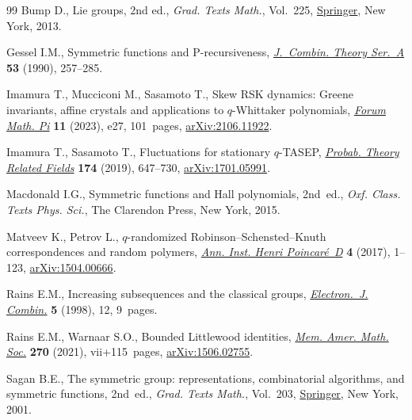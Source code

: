 \documentclass[11pt]{article}
\numberwithin{equation}{section}
\numberwithin{equation}{section}
\begin{document}
\begin{thebibliography}{99}
Bump D., Lie groups, 2nd ed., \textit{Grad. Texts Math.}, Vol.~225, \href{https://doi.org/10.1007/978-1-4614-8024-2}{Springer},
 New York, 2013.

Gessel I.M., Symmetric functions and {P}-recursiveness, \href{https://doi.org/10.1016/0097-3165(90)90060-A}{\textit{J.~Combin.
 Theory Ser.~A}} \textbf{53} (1990), 257--285.

Imamura T., Mucciconi M., Sasamoto T., Skew {RSK} dynamics: {G}reene
 invariants, affine crystals and applications to {$q$}-{W}hittaker
 polynomials, \href{https://doi.org/10.1017/fmp.2023.23}{\textit{Forum Math. Pi}} \textbf{11} (2023), e27, 101~pages,
 \href{https://arxiv.org/abs/2106.11922}{arXiv:2106.11922}.

Imamura T., Sasamoto T., Fluctuations for stationary {$q$}-{TASEP},
 \href{https://doi.org/10.1007/s00440-018-0868-3}{\textit{Probab. Theory Related Fields}} \textbf{174} (2019), 647--730,
 \href{https://arxiv.org/abs/1701.05991}{arXiv:1701.05991}.

Macdonald I.G., Symmetric functions and {H}all polynomials, 2nd~ed., \textit{Oxf.
 Class. Texts Phys. Sci.}, The Clarendon Press, New York, 2015.

Matveev K., Petrov L., {$q$}-randomized {R}obinson--{S}chensted--{K}nuth
 correspondences and random polymers, \href{https://doi.org/10.4171/AIHPD/36}{\textit{Ann. Inst. Henri Poincar\'e~D}}
 \textbf{4} (2017), 1--123, \href{https://arxiv.org/abs/1504.00666}{arXiv:1504.00666}.

Rains E.M., Increasing subsequences and the classical groups,
 \href{https://doi.org/10.37236/1350}{\textit{Electron.~J. Combin.}} \textbf{5} (1998), 12, 9~pages.

Rains E.M., Warnaar S.O., Bounded {L}ittlewood identities, \href{https://doi.org/10.1090/memo/1317}{\textit{Mem. Amer.
 Math. Soc.}} \textbf{270} (2021), vii+115~pages, \href{https://arxiv.org/abs/1506.02755}{arXiv:1506.02755}.

Sagan B.E., The symmetric group: representations, combinatorial algorithms, and
 symmetric functions, 2nd~ed., \textit{Grad. Texts Math.}, Vol.~203, \href{https://doi.org/10.1007/978-1-4757-6804-6}{Springer},
 New York, 2001.

\end{thebibliography}
\end{document}
